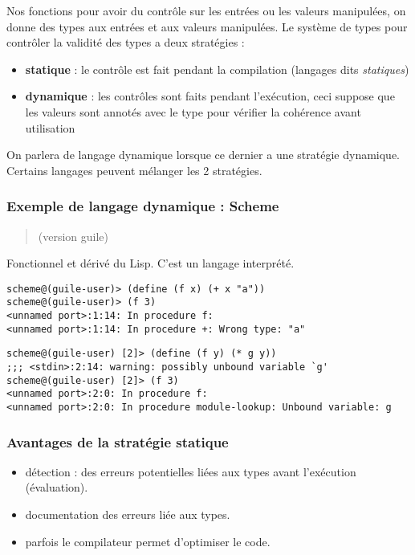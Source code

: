 \documentclass[]{article}
\providecommand{\tightlist}{%
  \setlength{\itemsep}{0pt}\setlength{\parskip}{0pt}}
\begin{document}
Nos fonctions pour avoir du contrôle sur les entrées ou les valeurs
manipulées, on donne des types aux entrées et aux valeurs manipulées. Le
système de types pour contrôler la validité des types a deux stratégies
:

\begin{itemize}
\tightlist
\item
  \textbf{statique} : le contrôle est fait pendant la compilation
  (langages dits \emph{statiques})
\item
  \textbf{dynamique} : les contrôles sont faits pendant l'exécution,
  ceci suppose que les valeurs sont annotés avec le type pour vérifier
  la cohérence avant utilisation
\end{itemize}

On parlera de langage dynamique lorsque ce dernier a une stratégie
dynamique. Certains langages peuvent mélanger les 2 stratégies.

\subsubsection{Exemple de langage dynamique :
Scheme}\label{exemple-de-langage-dynamique-scheme}

\begin{quote}
(version guile)
\end{quote}

Fonctionnel et dérivé du Lisp. C'est un langage interprété.

\begin{verbatim}
scheme@(guile-user)> (define (f x) (+ x "a"))
scheme@(guile-user)> (f 3)
<unnamed port>:1:14: In procedure f:
<unnamed port>:1:14: In procedure +: Wrong type: "a"
\end{verbatim}

\begin{verbatim}
scheme@(guile-user) [2]> (define (f y) (* g y))
;;; <stdin>:2:14: warning: possibly unbound variable `g'
scheme@(guile-user) [2]> (f 3)
<unnamed port>:2:0: In procedure f:
<unnamed port>:2:0: In procedure module-lookup: Unbound variable: g
\end{verbatim}

\subsubsection{Avantages de la stratégie
statique}\label{avantages-de-la-stratuxe9gie-statique}

\begin{itemize}
\tightlist
\item
  détection : des erreurs potentielles liées aux types avant l'exécution
  (évaluation).
\item
  documentation des erreurs liée aux types.
\item
  parfois le compilateur permet d'optimiser le code.
\end{itemize}
\end{document}
